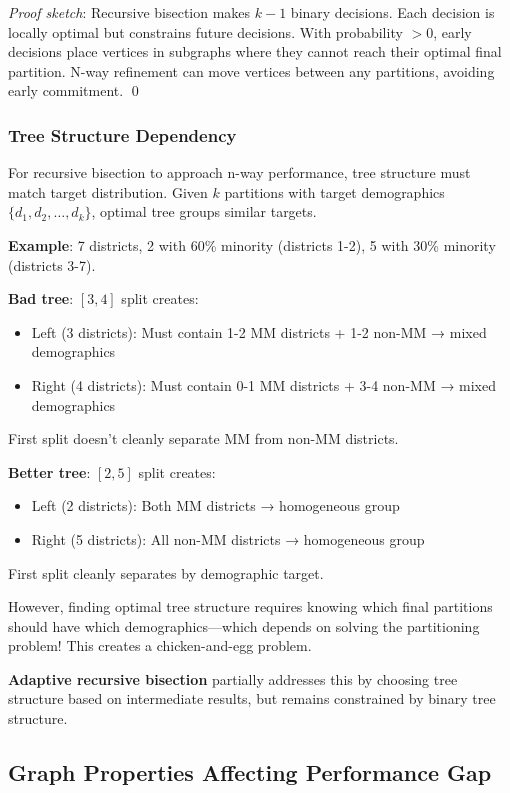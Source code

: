 \textit{Proof sketch}: Recursive bisection makes $k-1$ binary decisions. Each decision is locally optimal but constrains future decisions. With probability $> 0$, early decisions place vertices in subgraphs where they cannot reach their optimal final partition. N-way refinement can move vertices between any partitions, avoiding early commitment. \qed

\subsubsection{Tree Structure Dependency}

For recursive bisection to approach n-way performance, tree structure must match target distribution. Given $k$ partitions with target demographics $\{d_1, d_2, \ldots, d_k\}$, optimal tree groups similar targets.

\textbf{Example}: 7 districts, 2 with 60\% minority (districts 1-2), 5 with 30\% minority (districts 3-7).

\textbf{Bad tree}: $[3,4]$ split creates:
\begin{itemize}
\item Left (3 districts): Must contain 1-2 MM districts + 1-2 non-MM → mixed demographics
\item Right (4 districts): Must contain 0-1 MM districts + 3-4 non-MM → mixed demographics
\end{itemize}
First split doesn't cleanly separate MM from non-MM districts.

\textbf{Better tree}: $[2,5]$ split creates:
\begin{itemize}
\item Left (2 districts): Both MM districts → homogeneous group
\item Right (5 districts): All non-MM districts → homogeneous group
\end{itemize}
First split cleanly separates by demographic target.

However, finding optimal tree structure requires knowing which final partitions should have which demographics—which depends on solving the partitioning problem! This creates a chicken-and-egg problem.

\textbf{Adaptive recursive bisection} partially addresses this by choosing tree structure based on intermediate results, but remains constrained by binary tree structure.

\subsection{Graph Properties Affecting Performance Gap}

